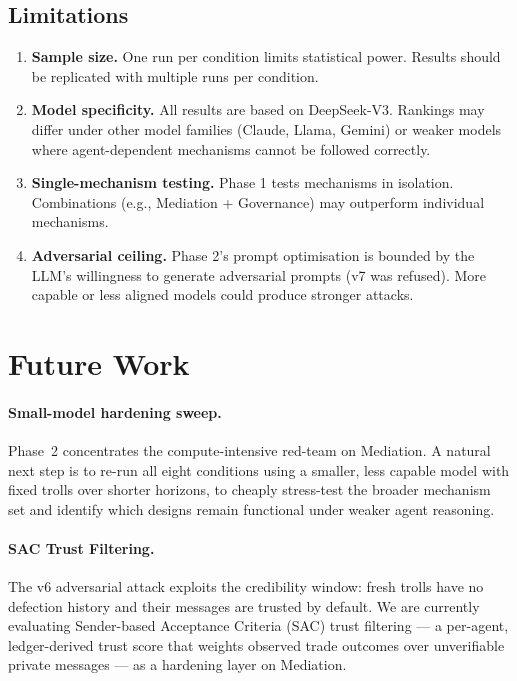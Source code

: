 \documentclass{article}
\begin{document}
\subsection{Limitations}

\begin{enumerate}
  \item \textbf{Sample size.} One run per condition limits statistical power. Results should be replicated with multiple runs per condition.
  \item \textbf{Model specificity.} All results are based on DeepSeek-V3. Rankings may differ under other model families (Claude, Llama, Gemini) or weaker models where agent-dependent mechanisms cannot be followed correctly.
  \item \textbf{Single-mechanism testing.} Phase 1 tests mechanisms in isolation. Combinations (e.g., Mediation + Governance) may outperform individual mechanisms.
  \item \textbf{Adversarial ceiling.} Phase 2's prompt optimisation is bounded by the LLM's willingness to generate adversarial prompts (v7 was refused). More capable or less aligned models could produce stronger attacks.
\end{enumerate}

\section{Future Work}
\label{sec:futurework}

\paragraph{Small-model hardening sweep.} Phase~2 concentrates the compute-intensive red-team on Mediation. A natural next step is to re-run all eight conditions using a smaller, less capable model with fixed trolls over shorter horizons, to cheaply stress-test the broader mechanism set and identify which designs remain functional under weaker agent reasoning.

\paragraph{SAC Trust Filtering.} The v6 adversarial attack exploits the credibility window: fresh trolls have no defection history and their messages are trusted by default. We are currently evaluating Sender-based Acceptance Criteria (SAC) trust filtering --- a per-agent, ledger-derived trust score that weights observed trade outcomes over unverifiable private messages --- as a hardening layer on Mediation.
\end{document}
